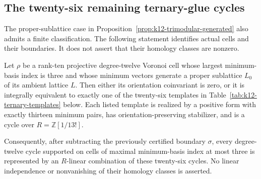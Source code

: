 \subsection{The twenty-six remaining ternary-glue cycles}
\label{subsec:k12-ternary-glue}

The proper-sublattice case in Proposition~\ref{prop:k12-trimodular-generated}
also admits a finite classification. The following statement identifies
actual cells and their boundaries. It does not assert that their homology
classes are nonzero.

\begin{theorem}
\label{thm:k12-ternary-cycles}
Let $\rho$ be a rank-ten projective degree-twelve Voronoi cell whose
largest minimum-basis index is three and whose minimum vectors generate
a proper sublattice $L_0$ of its ambient lattice $L$.
Then either its orientation coinvariant is zero, or it is integrally
equivalent to exactly one of the twenty-six templates in
Table~\ref{tab:k12-ternary-templates} below. Each listed template is
realized by a positive form with exactly thirteen minimum pairs, has
orientation-preserving stabilizer, and is a cycle over
$R=\mathbb Z[1/13!]$.

Consequently, after subtracting the previously certified boundary
$\sigma$, every degree-twelve cycle supported on cells of maximal
minimum-basis index at most three is represented by an $R$-linear
combination of these twenty-six cycles. No linear independence or
nonvanishing of their homology classes is asserted.
\end{theorem}

